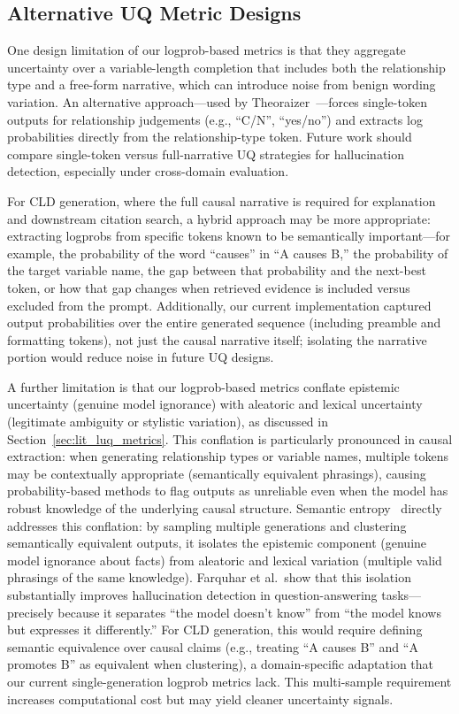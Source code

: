 \subsection{Alternative UQ Metric Designs}
One design limitation of our logprob-based metrics is that they aggregate uncertainty over a variable-length completion that includes both the relationship type and a free-form narrative, which can introduce noise from benign wording variation. An alternative approach---used by Theoraizer~\citep{Waaijers2024theoraizer}---forces single-token outputs for relationship judgements (e.g., ``C/N'', ``yes/no'') and extracts log probabilities directly from the relationship-type token. Future work should compare single-token versus full-narrative UQ strategies for hallucination detection, especially under cross-domain evaluation.

For CLD generation, where the full causal narrative is required for explanation and downstream citation search, a hybrid approach may be more appropriate: extracting logprobs from specific tokens known to be semantically important---for example, the probability of the word ``causes'' in ``A causes B,'' the probability of the target variable name, the gap between that probability and the next-best token, or how that gap changes when retrieved evidence is included versus excluded from the prompt. Additionally, our current implementation captured output probabilities over the entire generated sequence (including preamble and formatting tokens), not just the causal narrative itself; isolating the narrative portion would reduce noise in future UQ designs.

A further limitation is that our logprob-based metrics conflate epistemic uncertainty (genuine model ignorance) with aleatoric and lexical uncertainty (legitimate ambiguity or stylistic variation), as discussed in Section~\ref{sec:lit_luq_metrics}. This conflation is particularly pronounced in causal extraction: when generating relationship types or variable names, multiple tokens may be contextually appropriate (semantically equivalent phrasings), causing probability-based methods to flag outputs as unreliable even when the model has robust knowledge of the underlying causal structure. Semantic entropy~\citep{farquhar2024detecting} directly addresses this conflation: by sampling multiple generations and clustering semantically equivalent outputs, it isolates the epistemic component (genuine model ignorance about facts) from aleatoric and lexical variation (multiple valid phrasings of the same knowledge). Farquhar et al.\ show that this isolation substantially improves hallucination detection in question-answering tasks---precisely because it separates ``the model doesn't know'' from ``the model knows but expresses it differently.'' For CLD generation, this would require defining semantic equivalence over causal claims (e.g., treating ``A causes B'' and ``A promotes B'' as equivalent when clustering), a domain-specific adaptation that our current single-generation logprob metrics lack. This multi-sample requirement increases computational cost but may yield cleaner uncertainty signals.

